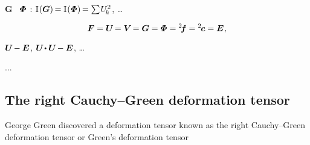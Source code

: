  $\bm{G}$ ~$\mathboldPhi$ :
${\mathrm{I}\hspace{.16ex}(\bm{G}) \hspace{-0.2ex} = \mathrm{I}\hspace{.16ex}(\mathboldPhi) \hspace{-0.2ex} = \textstyle\sum \hspace{-0.2ex} U_{\hspace{-0.25ex}k}^2}$, \dots


\nopagebreak\vspace{-0.2em}\begin{equation*}
\bm{F} = \bm{U} \hspace{-0.3ex} = \bm{V} \hspace{-0.3ex} = \bm{G} = \mathboldPhi = {^2}\hspace{-0.4ex}\bm{f} = {^2}\hspace{-0.2ex}\bm{c} = \UnitDyad
\hspace{.1ex},
\end{equation*}

\vspace{-0.2em}\noindent
{}     ${\bm{U} \hspace{-0.2ex} - \bm{E}}$, ${\bm{U} \hspace{-0.3ex} \dotp \bm{U} \hspace{-0.2ex} - \UnitDyad}$, \dots

...


\subsection*{The right Cauchy\hbox{--}Green deformation tensor}

George Green discovered a deformation tensor known as the right Cauchy\hbox{--}Green deformation tensor or Green’s deformation tensor

